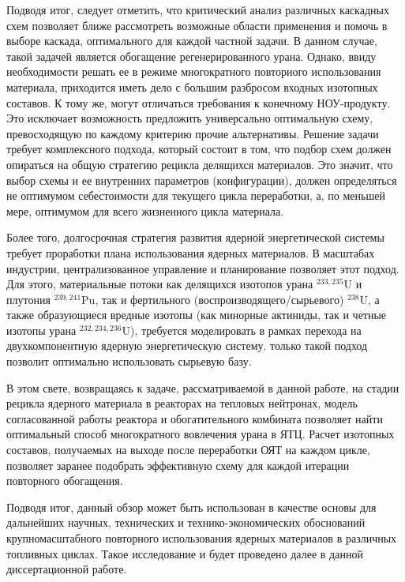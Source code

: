 Подводя итог, следует отметить, что критический анализ различных каскадных схем позволяет ближе рассмотреть возможные области применения и помочь в выборе каскада, оптимального для каждой частной задачи.
В данном случае, такой задачей является обогащение регенерированного урана.
Однако, ввиду необходимости решать ее в режиме многократного повторного использования материала, приходится иметь дело с большим разбросом входных изотопных составов.
К тому же, могут отличаться требования к конечному НОУ-продукту.
Это исключает возможность предложить универсально оптимальную схему, превосходящую по каждому критерию прочие альтернативы.
Решение задачи требует комплексного подхода, который состоит в том, что подбор схем должен опираться на общую стратегию рецикла делящихся материалов.
Это значит, что выбор схемы и ее внутренних параметров (конфигурации), должен определяться не оптимумом себестоимости для текущего цикла переработки, а, по меньшей мере, оптимумом для всего жизненного цикла материала.

Более того, долгосрочная стратегия развития ядерной энергетической системы требует проработки плана использования ядерных материалов.
В масштабах индустрии, централизованное управление и планирование позволяет этот подход.
Для этого, материальные потоки как делящихся изотопов урана $^{233,235}$U и плутония $^{239,241}$Pu, так и фертильного (воспроизводящего/сырьевого) $^{238}$U, а также образующиеся вредные изотопы (как минорные актиниды, так и четные изотопы урана $^{232,234,236}$U), требуется моделировать в рамках перехода на двухкомпонентную ядерную энергетическую систему.
только такой подход позволит оптимально использовать сырьевую базу.

В этом свете, возвращаясь к задаче, рассматриваемой в данной работе, на стадии рецикла ядерного материала в реакторах на тепловых нейтронах, модель согласованной работы реактора и обогатительного комбината позволяет найти оптимальный способ многократного вовлечения урана в ЯТЦ.
Расчет изотопных составов, получаемых на выходе после переработки ОЯТ на каждом цикле, позволяет заранее подобрать эффективную схему для каждой итерации повторного обогащения.

Подводя итог, данный обзор может быть использован в качестве основы для дальнейших научных, технических и технико-экономических обоснований крупномасштабного повторного использования ядерных материалов в различных топливных циклах.
Такое исследование и будет проведено далее в данной диссертационной работе.

